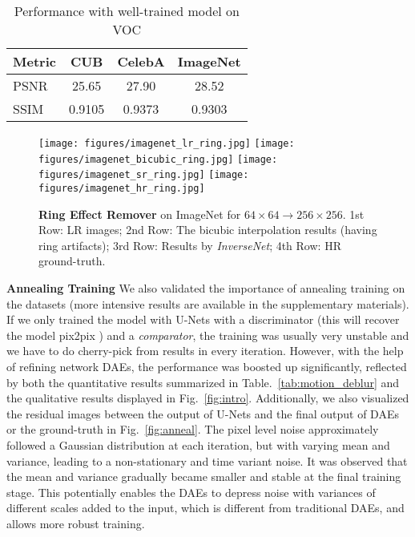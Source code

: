 \documentclass[10pt,twocolumn,letterpaper]{article}
\begin{document}
\begin{table}
\begin{center}
\setlength{\tabcolsep}{3pt}
\begin{tabular}{|l|c|c|c|}
\hline
Metric & CUB & CelebA & ImageNet \\
\hline
PSNR & 25.65 & 27.90 & 28.52 \\
SSIM & 0.9105 & 0.9373 & 0.9303 \\
\hline
\end{tabular}
\end{center}
\caption{Performance with well-trained model on VOC}
\label{tab:transfer}
\end{table}

\begin{figure*}[ht]
\centering
\texttt{[image: figures/imagenet\_lr\_ring.jpg]}
\texttt{[image: figures/imagenet\_bicubic\_ring.jpg]}
\texttt{[image: figures/imagenet\_sr\_ring.jpg]}
\texttt{[image: figures/imagenet\_hr\_ring.jpg]}
\caption{\textbf{Ring Effect Remover} on ImageNet for $64\times 64\rightarrow 256\times 256$. 1st Row: LR images; 2nd Row: The bicubic interpolation results (having ring artifacts); 3rd Row: Results by \emph{InverseNet}; 4th Row: HR ground-truth.}
\label{fig:ring}
\end{figure*}

\textbf{Annealing Training} We also validated the importance of annealing training on the datasets (more intensive results are available in the supplementary materials). 
If we only trained the model with U-Nets with a discriminator (this will recover the model pix2pix \cite{isola2016image}) and
a \emph{comparator}, the training was usually very unstable and we have to do cherry-pick from results in every iteration. 
However, with the help of refining network DAEs, the performance was boosted up significantly, reflected by both the 
quantitative results summarized in Table.~\ref{tab:motion_deblur} and the qualitative results displayed in Fig.~\ref{fig:intro}. 
Additionally, we also visualized the residual images between the output of U-Nets and the final output of DAEs or the ground-truth in Fig.~\ref{fig:anneal}. The pixel level noise approximately followed a Gaussian distribution at each iteration, but with varying mean and variance,
leading to a non-stationary and time variant noise.
It was observed that the mean and variance gradually became smaller and stable at the final training stage. 
This potentially enables the DAEs to depress noise with variances of different scales added to the input,
which is different from traditional DAEs, and allows more robust training.
\end{document}
